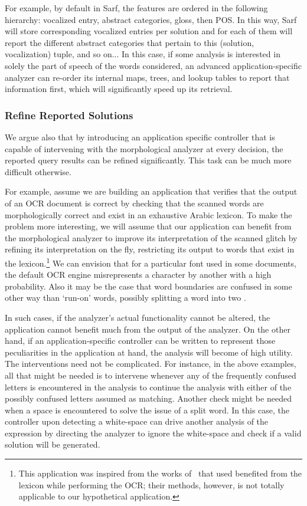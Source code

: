 \documentclass[a4,12pt]{report}
\begin{document}
For example, by default in Sarf, the features are ordered in the following hierarchy: 
vocalized entry, abstract categories, gloss, then POS. In this way, Sarf will store corresponding vocalized entries per 
solution and for each of them will report the different abstract categories that pertain to this (solution, vocalization) tuple,
and so on...
In this case, if some analysis is interested in solely the part of speech of the words considered, an advanced 
application-specific analyzer can re-order its internal maps, trees, and lookup tables to report 
that information first, which will significantly speed up its retrieval.

\subsubsection{Refine Reported Solutions}

We argue also that by introducing an application specific controller that is capable
of intervening with the morphological analyzer at every decision, the reported query results 
can be refined significantly. This task can be much more difficult otherwise. 

For example, assume we are
building an application that verifies that the output of an OCR document is correct by checking
that the scanned words are morphologically correct and exist in an exhaustive Arabic lexicon.
To make the problem more interesting, we will assume that our application can benefit from the morphological analyzer to 
improve its interpretation of the scanned glitch by refining its interpretation on the fly, restricting its output
to words that exist in the lexicon.\footnote{This application was inspired from the works of~\cite{Badr:95,Obaid:98} that
used benefited from the lexicon while performing the OCR; their methods, however, is not totally applicable to our
hypothetical application.}
We can envision that for a particular font used in some documents, 
the default OCR engine misrepresents a character 
by another with a high probability. Also it may be the case that word 
boundaries are confused in some other way than `run-on' words, possibly splitting a word into two \cite{Kukich:92}.

In such cases, if the analyzer's actual functionality cannot be altered, the application cannot 
benefit much from the output of the analyzer. On the other hand, if an application-specific controller
can be written to represent those peculiarities in the application at hand, the analysis will become 
of high utility. The interventions need not be complicated. For instance, in the above examples, all that might 
be needed is to intervene whenever any of the frequently confused letters is encountered in the analysis 
to continue the analysis with either of the possibly confused letters assumed as matching.
Another check might be needed when a space is encountered to solve the issue of a split word.
In this case, the controller upon detecting a white-space can drive another analysis of the expression by directing 
the analyzer to ignore the white-space and check if a valid solution will be generated.
\end{document}
